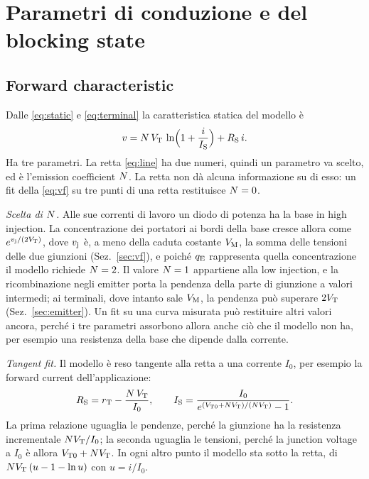 \documentclass[10pt,a4paper]{scrartcl}
\let\newcommand\pdvaluedefine
\newcommand{\qE}{q_\mathrm{E}}
\newcommand{\vj}{v_\mathrm{j}}
\newcommand{\IS}{I_\mathrm{S}}
\newcommand{\RS}{R_\mathrm{S}}
\newcommand{\VT}{V_\mathrm{T}}
\newcommand{\VTo}{V_\mathrm{T0}}
\newcommand{\rT}{r_\mathrm{T}}
\newcommand{\Nem}{N}                          %
\newcommand{\VM}{V_\mathrm{M}}
\begin{document}
\section{Parametri di conduzione e del blocking state}
\label{sec:static}
\subsection{Forward characteristic}
\label{sec:forward}
Dalle \eqref{eq:static} e \eqref{eq:terminal} la caratteristica statica del modello è
\begin{equation}
v = \Nem\,\VT\,\ln\Bigl(1 + \frac{i}{\IS}\Bigr) + \RS\, i .
\label{eq:vf}
\end{equation}
Ha tre parametri. La retta \eqref{eq:line} ha due numeri, quindi un parametro va scelto, ed è l'emission coefficient $\Nem$. La retta non dà alcuna informazione su di esso: un fit della \eqref{eq:vf} su tre punti di una retta restituisce $\Nem = 0$.

\emph{Scelta di $\Nem$.} Alle sue correnti di lavoro un diodo di potenza ha la base in high injection. La concentrazione dei portatori ai bordi della base cresce allora come $e^{\vj/(2\VT)}$, dove $\vj$ è, a meno della caduta costante $\VM$, la somma delle tensioni delle due giunzioni (Sez.~\ref{sec:vf}), e poiché $\qE$ rappresenta quella concentrazione il modello richiede $\Nem = 2$. Il valore $\Nem = 1$ appartiene alla low injection, e la ricombinazione negli emitter porta la pendenza della parte di giunzione a valori intermedi; ai terminali, dove intanto sale $\VM$, la pendenza può superare $2\VT$ (Sez.~\ref{sec:emitter}). Un fit su una curva misurata può restituire altri valori ancora, perché i tre parametri assorbono allora anche ciò che il modello non ha, per esempio una resistenza della base che dipende dalla corrente.

\emph{Tangent fit.} Il modello è reso tangente alla retta a una corrente $I_0$, per esempio la forward current dell'applicazione:
\begin{equation}
\RS = \rT - \frac{\Nem\,\VT}{I_0} , \qquad \IS = \frac{I_0}{e^{(\VTo + \Nem\VT)/(\Nem\VT)} - 1} .
\label{eq:tangent}
\end{equation}
La prima relazione uguaglia le pendenze, perché la giunzione ha la resistenza incrementale $\Nem\VT/I_0$; la seconda uguaglia le tensioni, perché la junction voltage a $I_0$ è allora $\VTo + \Nem\VT$. In ogni altro punto il modello sta sotto la retta, di $\Nem\VT\,(u - 1 - \ln u)$ con $u = i/I_0$.
\end{document}

